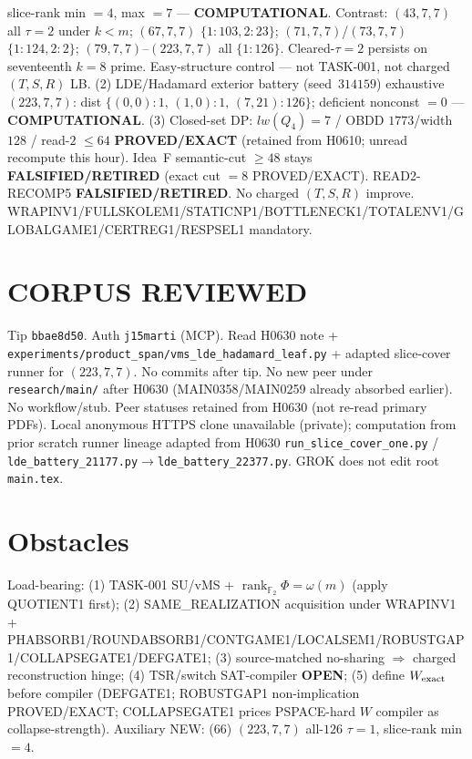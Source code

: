 \documentclass[11pt]{article}
\begin{document}
slice-rank min $=4$, max $=7$ --- \textbf{COMPUTATIONAL}.
Contrast: $(43,7,7)$ all $\tau{=}2$ under $k{<}m$; $(67,7,7)$ $\{1{:}103,2{:}23\}$;
$(71,7,7)$/$(73,7,7)$ $\{1{:}124,2{:}2\}$; $(79,7,7)$--$(223,7,7)$ all $\{1{:}126\}$.
Cleared-$\tau{=}2$ persists on seventeenth $k{=}8$ prime. Easy-structure control --- not TASK-001,
not charged $(T,S,R)$ LB.
(2) LDE/Hadamard exterior battery (seed~$314159$) exhaustive $(223,7,7)$:
dist $\{(0,0){:}1,\,(1,0){:}1,\,(7,21){:}126\}$; deficient nonconst $=0$ --- \textbf{COMPUTATIONAL}.
(3) Closed-set DP: $lw(Q_4)=7$ / OBDD $1773$/width $128$ / read-$2$ $\le64$
\textbf{PROVED/EXACT} (retained from H0610; unread recompute this hour).
Idea~F semantic-cut $\ge48$ stays \textbf{FALSIFIED/RETIRED} (exact cut $=8$ PROVED/EXACT).
READ2-RECOMP5 \textbf{FALSIFIED/RETIRED}. No charged $(T,S,R)$ improve.
WRAPINV1/FULLSKOLEM1/STATICNP1/BOTTLENECK1/TOTALENV1/GLOBALGAME1/CERTREG1/RESPSEL1 mandatory.

\section*{CORPUS REVIEWED}
Tip \texttt{bbae8d50}. Auth \texttt{j15marti} (MCP). Read H0630 note +
\texttt{experiments/product\_span/vms\_lde\_hadamard\_leaf.py} + adapted slice-cover runner for $(223,7,7)$.
No commits after tip. No new peer under \texttt{research/main/} after H0630
(MAIN0358/MAIN0259 already absorbed earlier).
No workflow/stub. Peer statuses retained from H0630 (not re-read primary PDFs).
Local anonymous HTTPS clone unavailable (private);
computation from prior scratch runner lineage adapted from H0630
\texttt{run\_slice\_cover\_one.py} / \texttt{lde\_battery\_21177.py}$\to$\texttt{lde\_battery\_22377.py}.
GROK does not edit root \texttt{main.tex}.

\section*{Obstacles}
Load-bearing: (1) TASK-001 SU/vMS + $\operatorname{rank}_{\mathbb F_2}\Phi=\omega(m)$ (apply QUOTIENT1 first);
(2) SAME\_REALIZATION acquisition under WRAPINV1 + PHABSORB1/ROUNDABSORB1/CONTGAME1/LOCALSEM1/ROBUSTGAP1/COLLAPSEGATE1/DEFGATE1;
(3) source-matched no-sharing $\Rightarrow$ charged reconstruction hinge;
(4) TSR/switch SAT-compiler \textbf{OPEN};
(5) define $W_{\rm exact}$ before compiler (DEFGATE1; ROBUSTGAP1 non-implication PROVED/EXACT;
COLLAPSEGATE1 prices PSPACE-hard $W$ compiler as collapse-strength).
Auxiliary NEW: (66) $(223,7,7)$ all-$126$ $\tau{=}1$, slice-rank min $=4$.
\end{document}
